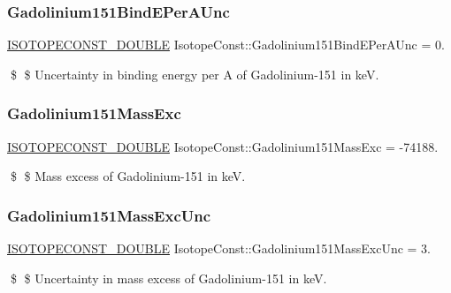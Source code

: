 \subsubsection{\texorpdfstring{Gadolinium151\+Bind\+E\+Per\+A\+Unc}{Gadolinium151BindEPerAUnc}}
{\footnotesize\ttfamily \mbox{\hyperlink{group___isotope_const-_macros_ga8f45a7272ce02c0b4c65c44636ed719a}{I\+S\+O\+T\+O\+P\+E\+C\+O\+N\+S\+T\+\_\+\+D\+O\+U\+B\+LE}} Isotope\+Const\+::\+Gadolinium151\+Bind\+E\+Per\+A\+Unc = 0.}

\$ \$ Uncertainty in binding energy per A of Gadolinium-\/151 in keV. \mbox{\label{group___isotope_const-_gadolinium-_gd151_gabd98b2e3e953fa3252a5db3eaf90341b}} 
\subsubsection{\texorpdfstring{Gadolinium151\+Mass\+Exc}{Gadolinium151MassExc}}
{\footnotesize\ttfamily \mbox{\hyperlink{group___isotope_const-_macros_ga8f45a7272ce02c0b4c65c44636ed719a}{I\+S\+O\+T\+O\+P\+E\+C\+O\+N\+S\+T\+\_\+\+D\+O\+U\+B\+LE}} Isotope\+Const\+::\+Gadolinium151\+Mass\+Exc = -\/74188.}

\$ \$ Mass excess of Gadolinium-\/151 in keV. \mbox{\label{group___isotope_const-_gadolinium-_gd151_gad1f4e1e885ea87d286ea203056052934}} 
\subsubsection{\texorpdfstring{Gadolinium151\+Mass\+Exc\+Unc}{Gadolinium151MassExcUnc}}
{\footnotesize\ttfamily \mbox{\hyperlink{group___isotope_const-_macros_ga8f45a7272ce02c0b4c65c44636ed719a}{I\+S\+O\+T\+O\+P\+E\+C\+O\+N\+S\+T\+\_\+\+D\+O\+U\+B\+LE}} Isotope\+Const\+::\+Gadolinium151\+Mass\+Exc\+Unc = 3.}

\$ \$ Uncertainty in mass excess of Gadolinium-\/151 in keV. \mbox{\label{group___isotope_const-_gadolinium-_gd151_ga21b7094af1c369d44065c5f4ce1d34d5}} 
